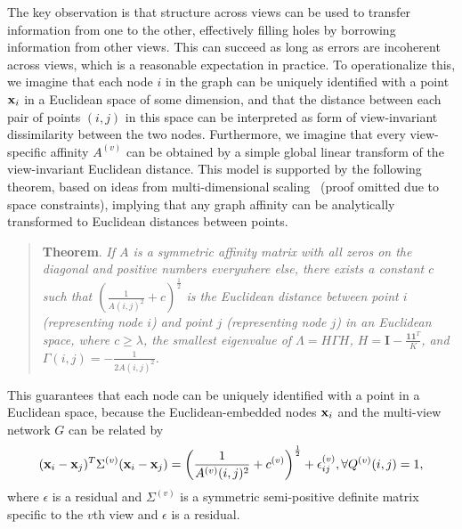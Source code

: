 The key observation is that structure across views can be used to transfer information from one to the other, effectively filling holes by borrowing information from other views. This can succeed as long as errors are incoherent across views, which is a reasonable expectation in practice. To operationalize this, we imagine that each node $i$ in the graph can be uniquely identified with a point ${\bf x}_i$ in a Euclidean space of some dimension, and that the distance between each pair of points $(i,j)$ in this space can be interpreted as form of  view-invariant dissimilarity between the two nodes. Furthermore, we imagine that every view-specific affinity $A^{(v)}$ can be obtained by a simple global linear transform of the view-invariant Euclidean distance. This model is supported by the following theorem, based on ideas from multi-dimensional scaling~\cite{CoxMDS} (proof omitted due to space constraints), implying that any graph affinity can be analytically transformed to Euclidean distances between points.

\begin{quote}
\textbf{Theorem}. \textit{If $A$ is a symmetric affinity matrix with all zeros on the diagonal and positive numbers everywhere else, there exists a constant $c$ such that $(\frac{1}{A(i,j)^2}+c)^{\frac{1}{2}}$ is the Euclidean distance between point $i$ (representing node $i$) and point $j$ (representing node $j$) in an Euclidean space, where $c\geq\lambda$, the smallest eigenvalue of $\Lambda=H\Gamma H$, $H=\mathbf{I}-\frac{\mathbf{1}\mathbf{1}^T}{K}$, and $\Gamma(i,j)=-\frac{1}{2A(i,j)^2}$.} 
\end{quote}

This guarantees that each node can be uniquely identified with a point in a Euclidean space, because the Euclidean-embedded nodes ${\bf x}_i$ and the multi-view network $G$ can be related by
\begin{equation}\label{eq:embed}
({\bf x}_i-{\bf x}_j)^{T}\Sigma^{(v)}({\bf x}_i-{\bf x}_j)=\left(\frac{1}{A^{(v)}(i,j)^2}+c^{(v)}\right)^{\frac{1}{2}}+\epsilon^{(v)}_{ij}, \forall Q^{(v)}(i,j)=1,
\end{equation}
where $\epsilon$ is a residual and $\Sigma^{(v)}$ is a symmetric semi-positive definite matrix specific to the $v$th view and $\epsilon$ is a residual.  

